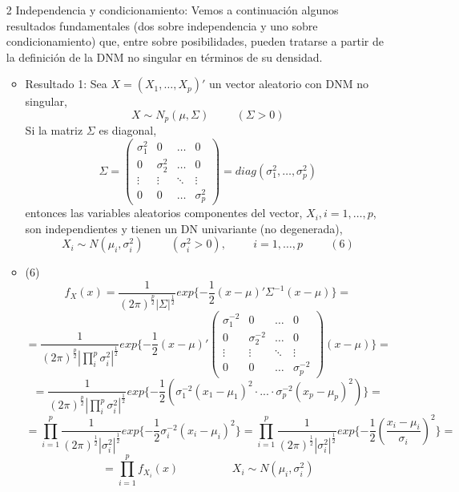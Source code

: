 \documentclass[11pt,a4paper]{article}
\begin{document}
\begin{itemize}
\item[2] Independencia y condicionamiento: Vemos a continuación algunos resultados fundamentales (dos sobre independencia y uno sobre condicionamiento) que, entre sobre posibilidades, pueden tratarse a partir de la definición de la DNM no singular en términos de su densidad.

\begin{itemize}
\item Resultado 1: Sea $X = (X_{1}, \dots, X_{p})'$ un vector aleatorio con DNM no singular,
$$X \sim N_{p}(\mu, \Sigma) \hspace{1cm} (\Sigma > 0)$$
Si la matriz $\Sigma$ es diagonal,
$$\Sigma = \begin{pmatrix}
\sigma_{1}^{2} & 0 & \dots & 0 \\
0 & \sigma_{2}^{2} & \dots & 0 \\
\vdots & \vdots & \ddots & \vdots \\
0 & 0 & \dots & \sigma_{p}^{2}
\end{pmatrix} = diag(\sigma_{1}^{2}, \dots, \sigma_{p}^{2})$$
entonces las variables aleatorios componentes del vector, $X_{i}, i = 1, \dots, p$, son independientes y tienen un DN univariante (no degenerada),
$$X_{i} \sim N(\mu_{i}, \sigma_{i}^{2}) \hspace{1cm} (\sigma_{i}^{2} > 0), \hspace{1cm} i = 1, \dots, p \hspace{1cm} (6)$$

\item (6) $$f_{X}(x) = \frac{1}{(2\pi)^{\frac{p}{2}}|\Sigma|^{\frac{1}{2}}} exp\{-\frac{1}{2}(x - \mu)' \Sigma^{-1}(x - \mu)\} =$$
$$= \frac{1}{(2\pi)^{\frac{p}{2}}|\prod_{i}^{p} \sigma_{i}^{2}|^{\frac{1}{2}}} exp\{-\frac{1}{2} (x-\mu)' \begin{pmatrix}
\sigma_{1}^{-2} & 0 & \dots & 0 \\
0 & \sigma_{2}^{-2} & \dots & 0 \\
\vdots & \vdots & \ddots & \vdots \\
0 & 0 & \dots & \sigma_{p}^{-2}
\end{pmatrix} (x - \mu)\} =$$
$$= \frac{1}{(2\pi)^{\frac{p}{2}}|\prod_{i}^{p} \sigma_{i}^{2}|^{\frac{1}{2}}} exp\{-\frac{1}{2} (\sigma_{1}^{-2} (x_{1} - \mu_{1})^{2} \cdot ... \cdot \sigma_{p}^{-2}(x_{p} - \mu_{p})^{2})\} =$$
$$= \prod_{i=1}^{p} \frac{1}{(2\pi)^{\frac{1}{2}}|\sigma_{i}^{2}|^{\frac{1}{2}}} exp\{-\frac{1}{2} \sigma_{i}^{-2} (x_{i} - \mu_{i})^{2}\} = \prod_{i=1}^{p} \frac{1}{(2\pi)^{\frac{1}{2}}|\sigma_{i}^{2}|^{\frac{1}{2}}} exp\{-\frac{1}{2} (\frac{x_{i} - \mu_{i}}{\sigma_{i}})^{2}\} =$$
$$= \prod_{i=1}^{p} f_{X_{i}}(x) \hspace{2cm} X_{i} \sim N(\mu_{i}, \sigma_{i}^{2})$$


\end{itemize}
\end{itemize}
\end{document}
